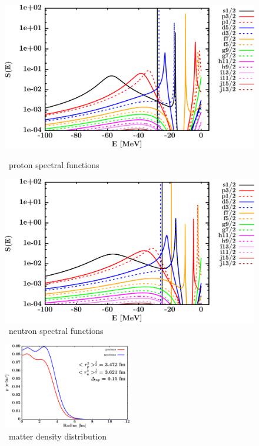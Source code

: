 \begin{figure}[H]
    \centering
    \begin{minipage}{0.45\textwidth}
        \centering
        \includegraphics[width=1.0\textwidth]{figures/ca48_protonSpectralFunctions.png}
        \caption{\caEight\ proton spectral functions}
        \label{DOMFitData_ca48_proton_spectralFunctions}
    \end{minipage}\hfill
    \begin{minipage}{0.45\textwidth}
        \centering
        \includegraphics[width=1.0\textwidth]{figures/ca48_neutronSpectralFunctions.png}
        \caption{\caEight\ neutron spectral functions}
        \label{DOMFitData_ca48_neutron_spectralFunctions}
    \end{minipage}
\end{figure}

\begin{figure}[H]
    \centering
    \includegraphics[width = 0.5\textwidth]{figures/ca48_matterDensity.png}
    \caption{\caEight\ matter density distribution}
    \label{DOMFitData_ca48_matterDensity}
\end{figure}

